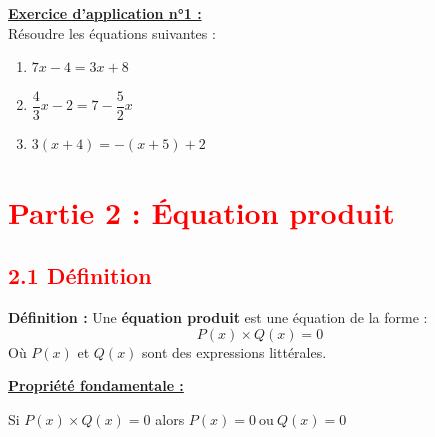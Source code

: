 \documentclass[12pt]{article}
\begin{document}
\vspace{10pt}

\begin{mdframed}[
    linewidth=1pt,
    roundcorner=5pt,
    linecolor=RoyalBlue,
    innertopmargin=10pt,
    innerbottommargin=10pt
]
{\color{RoyalBlue}\textbf{\underline{Exercice d'application n°1 :}}}
\vspace{5pt}
\\
Résoudre les équations suivantes :
\begin{enumerate}
    \item $7x - 4 = 3x + 8$
    \item $\dfrac{4}{3}x - 2 = 7 - \dfrac{5}{2}x$
    \item $3(x+4) = -(x+5) + 2$
\end{enumerate}
\end{mdframed}

\newpage


\section*{\textcolor{red}{Partie 2 : Équation produit}}

\subsection*{\textcolor{red}{2.1 Définition}}

\vspace{5pt}

\begin{mdframed}[
    linewidth=1pt,
    roundcorner=5pt,
    linecolor=ForestGreen
]
{\color{ForestGreen}\textbf{Définition :}}  
Une \textbf{équation produit} est une équation de la forme :
\[
P(x) \times Q(x) = 0
\]
Où $P(x)$ et $Q(x)$ sont des expressions littérales.
\end{mdframed}

\vspace{10pt}

\begin{mdframed}[
    linewidth=1pt,
    roundcorner=5pt,
    linecolor=Red,
    innertopmargin=10pt,
]
{\color{Red}\textbf{\underline{Propriété fondamentale :}}
\begin{center}
    Si $P(x) \times Q(x) = 0$ alors  $P(x)=0 \ \text{ou} \ Q(x)=0$
\end{center}
}
\end{mdframed}
\end{document}
